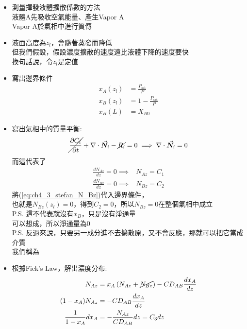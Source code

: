 \documentclass[../main.tex]{subfiles}
\begin{document}
\begin{itemize}
  \item 測量揮發液體擴散係數的方法\\
  液體A先吸收空氣能量、產生Vapor A\\
  Vapor A於氣相中進行質傳
  \item 液面高度為$z_l$，會隨著蒸發而降低\\
  但我們假設，假設濃度擴散的速度遠比液體下降的速度要快\\
  換句話說，令$z_l$是定值
  \item 寫出邊界條件
  \begin{align}
    x_A(z_l) &= \frac{P_{\text{sat}}}{P} \label{eq:ch4_3_stefan_bc1}\\
    x_B(z_l) &= 1 - \frac{P_{\text{sat}}}{P} \label{eq:ch4_3_stefan_bc2}\\
    x_B(L) &= X_{B0} \label{eq:ch4_3_stefan_bc3}
  \end{align}
  \item 寫出氣相中的質量平衡:
  \begin{equation}
    \cancel{\frac{\partial C_i}{\partial t}} + \nabla \cdot \vec{\bm N_i} - \cancel{R_i} = 0 \implies \nabla \cdot \vec{\bm N_i} = 0
  \end{equation}
  而這代表了
  \begin{align}
    \frac{d N_{Az}}{dz} = 0 \implies & N_{Az} = C_1\label{eq:ch4_3_stefan_N_Az}\\
    \frac{d N_{Bz}}{dz} = 0 \implies & N_{Bz} = C_2\label{eq:ch4_3_stefan_N_Bz}
  \end{align}
  將(\ref{eq:ch4_3_stefan_N_Bz})代入邊界條件，\\
  也就是$N_{Bz}(z_l) = 0$，得到$C_2 = 0$，所以$N_{Bz} = 0$在整個氣相中成立\\
  P.S. 這不代表就沒有$x_B$，只是沒有淨通量\\
  可以想成，所以淨通量為0\\
  P.S. 反過來說，只要另一成分進不去擴散原，又不會反應，那就可以把它當成介質\\
  我們稱為
  \item 根據Fick's Law，解出濃度分布:
  \begin{align}
    N_{Az}&=x_A\left(N_{Az}+\cancel{N_{Bz}}\right) - C D_{AB}\frac{dx_{A}}{dz} \nonumber\\
    (1-x_A)N_{Az} &= - C D_{AB}\frac{dx_{A}}{dz} \nonumber\\
    \frac{1}{1-x_A}dx_A &= - \frac{N_{Az}}{C D_{AB}}dz = C_3 dz \label{eq:ch4_3_stefan_diff_eq} \\

\end{align}
\end{itemize}
\end{document}
